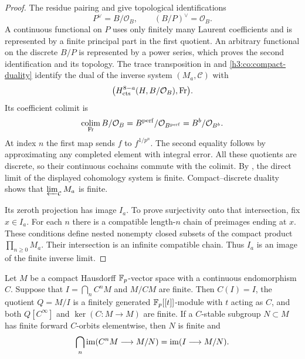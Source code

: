 \begin{proof}
The residue pairing and  give topological
identifications
\begin{equation}\label{h3:co:residue-duals}
 P^\vee=B/\mathcal O_B,\qquad (B/P)^\vee=\mathcal O_B.
\end{equation}
A continuous functional on $P$ uses only finitely many Laurent
coefficients and is represented by a finite principal part in the first
quotient.  An arbitrary functional on the discrete $B/P$ is represented
by a power series, which proves the second identification and its
topology.  The trace transposition in  and
\eqref{h3:co:compact-duality} identify the dual of the inverse system
$(M_a,\mathcal C)$ with
\[
 \bigl(H^{8-a}_{\mathrm{cts}}(H,B/\mathcal O_B),\mathrm{Fr}\bigr).
\]
Its coefficient colimit is
\begin{equation}\label{h3:co:discrete-perfection-quotient}
 \operatorname*{colim}_{\mathrm{Fr}}B/\mathcal O_B
 =B^{\mathrm{perf}}/\mathcal O_{B^{\mathrm{perf}}}
 =B^b/\mathcal O_{B^b}.
\end{equation}
At index $n$ the first map sends $f$ to $f^{1/p^n}$.
The second equality follows by approximating any completed element with
integral error.  All these quotients are discrete, so their continuous
cochains commute with the colimit.  By
, the direct limit of the displayed
cohomology system is finite.  Compact--discrete duality shows that
$\varprojlim_{\mathcal C}M_a$ is finite.

Its zeroth projection has image $I_a$.  To prove surjectivity onto that
intersection, fix $x\in I_a$.  For each $n$ there is a compatible
length-$n$ chain of preimages ending at $x$.  These conditions define
nested nonempty closed subsets of the compact product
$\prod_{n\geq0}M_a$.  Their intersection is an infinite compatible
chain.  Thus $I_a$ is an image of the finite inverse limit.
\end{proof}

\begin{lemma}\label{h3:co:compact-cartier}
Let $M$ be a compact Hausdorff $\mathbb F_p$-vector space with a continuous
endomorphism $C$.  Suppose that $I=\bigcap_n C^nM$ and $M/CM$ are finite.
Then $C(I)=I$, the quotient $Q=M/I$ is a finitely generated
$\mathbb F_p[[t]]$-module with $t$ acting as $C$, and both $Q[C^\infty]$ and
$\ker(C:M\to M)$ are finite.
If a $C$-stable subgroup $N\subset M$ has finite forward $C$-orbits
elementwise, then $N$ is finite and
\begin{equation}\label{h3:co:stable-quotient}
 \bigcap_n\operatorname{im}(C^nM\longrightarrow M/N)
 =\operatorname{im}(I\longrightarrow M/N).
\end{equation}
\end{lemma}

